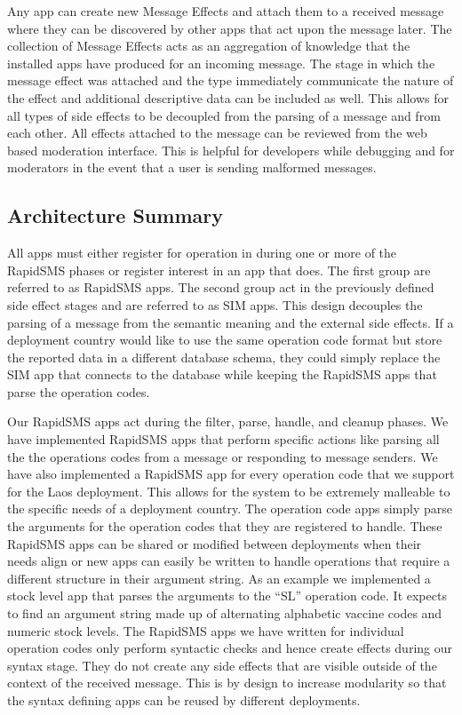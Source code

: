 \documentclass{acm_proc_article-sp}
\begin{document}
Any app can create new Message Effects and attach them to a received message where they can be discovered by other apps that act upon the message later. The collection of Message Effects acts as an aggregation of knowledge that the installed apps have produced for an incoming message. The stage in which the message effect was attached and the type immediately communicate the nature of the effect and additional descriptive data can be included as well. This allows for all types of side effects to be decoupled from the parsing of a message and from each other. All effects attached to the message can be reviewed from the web based moderation interface. This is helpful for developers while debugging and for moderators in the event that a user is sending malformed messages.

\subsection{Architecture Summary}

All apps must either register for operation in during one or more of the RapidSMS phases or register interest in an app that does. The first group are referred to as RapidSMS apps. The second group act in the previously defined side effect stages and are referred to as SIM apps. This design decouples the parsing of a message from the semantic meaning and the external side effects. If a deployment country would like to use the same operation code format but store the reported data in a different database schema, they could simply replace the SIM app that connects to the database while keeping the RapidSMS apps that parse the operation codes.

Our RapidSMS apps act during the filter, parse, handle, and cleanup phases. We have implemented RapidSMS apps that perform specific actions like parsing all the the operations codes from a message or responding to message senders. We have also implemented a RapidSMS app for every operation code that we support for the Laos deployment. This allows for the system to be extremely malleable to the specific needs of a deployment country. The operation code apps simply parse the arguments for the operation codes that they are registered to handle. These RapidSMS apps can be shared or modified between deployments when their needs align or new apps can easily be written to handle operations that require a different structure in their argument string. As an example we implemented a stock level app that parses the arguments to the “SL” operation code. It expects to find an argument string made up of alternating alphabetic vaccine codes and numeric stock levels. The RapidSMS apps we have written for individual operation codes only perform syntactic checks and hence create effects during our syntax stage. They do not create any side effects that are visible outside of the context of the received message. This is by design to increase modularity so that the syntax defining apps can be reused by different deployments.
 
\end{document}
